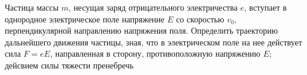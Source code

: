 Частица массы $m$, несущая заряд отрицательного электричества $e$, вступает в однородное электрическое поле напряжение $E$
со скоростью $v_{0}$, перпендикулярной направлению напряжения поля. Определить траекторию дальнейшего движения частицы,
зная, что в электрическом поле на нее действует сила $F=eE$, направленная в сторону, противоположную напряжению $E$;
дейсвием силы тяжести пренебречь
